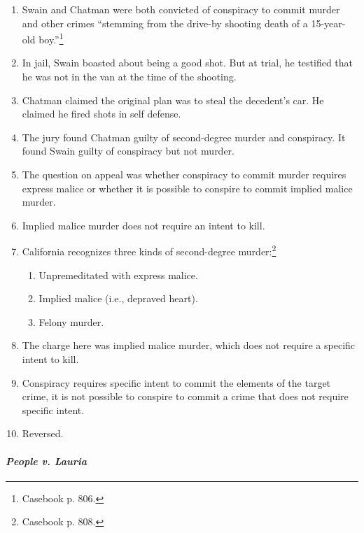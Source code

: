\begin{enumerate}
    \item Swain and Chatman were both convicted of conspiracy to commit murder 
    and other crimes ``stemming from the drive-by shooting death of a 
    15-year-old boy.''\footnote{Casebook p. 806.}
    \item In jail, Swain boasted about being a good shot. But at trial, he 
    testified that he was not in the van at the time of the shooting.
    \item Chatman claimed the original plan was to steal the decedent's car. 
    He claimed he fired shots in self defense.
    \item The jury found Chatman guilty of second-degree murder and 
    conspiracy.  It found Swain guilty of conspiracy but not murder.
    \item The question on appeal was whether conspiracy to commit murder 
    requires express malice or whether it is possible to conspire to commit 
    implied malice murder.
    \item Implied malice murder does not require an intent to kill.
    \item California recognizes three kinds of second-degree 
    murder:\footnote{Casebook p. 808.}
    \begin{enumerate}
        \item Unpremeditated with express malice.
        \item Implied malice (i.e., depraved heart).
        \item Felony murder.
    \end{enumerate}
    \item The charge here was implied malice murder, which does not require a 
    specific intent to kill.
    \item Conspiracy requires specific intent to commit the elements of the 
    target crime, it is not possible to conspire to commit a crime that does 
    not require specific intent.
    \item Reversed.
\end{enumerate}

\paragraph{\emph{People v. Lauria}}

